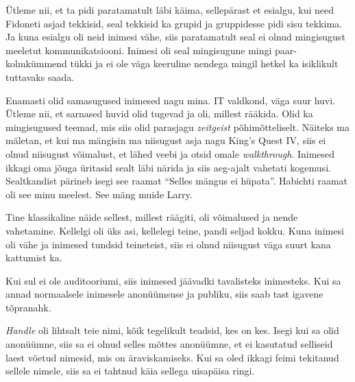 
Ütleme nii, et ta pidi paratamatult läbi käima, sellepärast et esialgu, kui 
need Fidoneti asjad tekkisid, seal tekkisid ka grupid ja gruppidesse pidi sisu 
tekkima. Ja kuna esialgu oli neid inimesi vähe, siis paratamatult seal ei olnud 
mingisugust meeletut kommunikatsiooni. Inimesi oli seal mingisugune mingi 
paar-kolmkümmend tükki ja ei ole väga keeruline nendega  mingil hetkel ka 
isiklikult tuttavaks saada.


Enamasti olid samasugused inimesed nagu mina. IT valdkond, väga suur huvi. 
Ütleme nii, et sarnased huvid olid tugevad ja oli, millest rääkida. Olid ka 
mingisugused teemad, mis siis olid parasjagu \emph{zeitgeist} põhimõtteliselt. 
Näiteks ma mäletan, et kui ma mängisin ma niisugust asja nagu King's Quest 
IV, siis ei olnud niisugust võimalust, et lähed 
veebi ja otsid omale \emph{walkthrough}. Inimesed ikkagi oma jõuga üritasid 
sealt läbi närida ja siis aeg-ajalt vahetati kogemusi. Sealtkandist pärineb 
isegi see raamat \enquote{Selles mängus ei hüpata}. 
Habichti raamat oli see minu meelest. See mäng muide 
Larry.

Tine klassikaline näide sellest, millest räägiti, oli võimalused ja nende 
vahetamine. Kellelgi oli üks asi, kellelegi teine, pandi seljad kokku. Kuna 
inimesi oli vähe ja inimesed tundsid teineteist, siis ei olnud niisugust väga 
suurt kana kattumist ka.


Kui sul ei ole auditooriumi, siis inimesed jäävadki tavalisteks inimesteks. Kui 
sa annad normaalsele inimesele anonüümsuse ja publiku, siis saab tast igavene 
tõpranahk.
                 

\emph{Handle} oli lihtsalt teie nimi, kõik tegelikult teadsid, kes on kes. 
Isegi kui sa olid anonüümne, siis sa ei olnud selles mõttes anonüümne, et ei 
kasutatud selliseid laest võetud nimesid, mis on  äraviskamiseks. Kui sa oled 
ikkagi feimi tekitanud sellele nimele, siis sa ei tahtnud käia sellega 
uisapäisa ringi. 

